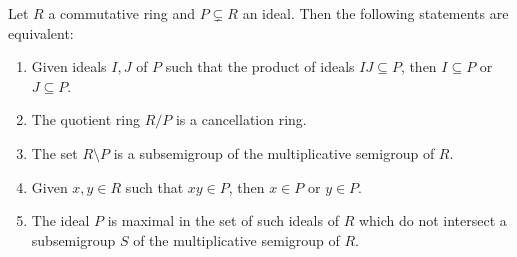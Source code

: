 \documentclass[12pt]{article}
\newcommand{\<}{\langle}
\renewcommand{\>}{\rangle}
\begin{document}
\begin{thm}
\label{thm:comm}
Let $R$ a commutative ring and $P\subsetneq R$ an ideal. Then the
following statements are equivalent:
\begin{enumerate}
\item\label{i:b1}Given ideals $I,J$ of $P$ such that the product of
ideals $IJ\subseteq P$, then $I\subseteq P$ or $J\subseteq P$.
\item\label{i:b2}The quotient ring $R/P$ is a cancellation ring.
\item\label{i:b3}The set $R\setminus P$ is a subsemigroup of the
multiplicative semigroup of $R$.
\item\label{i:b4}Given $x,y\in R$ such that $xy\in P$, then $x\in P$
or $y\in P$.
\item\label{i:b5} The ideal $P$ is maximal in the set of such ideals of $R$ which do not intersect a subsemigroup $S$ of the multiplicative semigroup of $R$.

\end{enumerate}
\end{thm}
\end{document}
